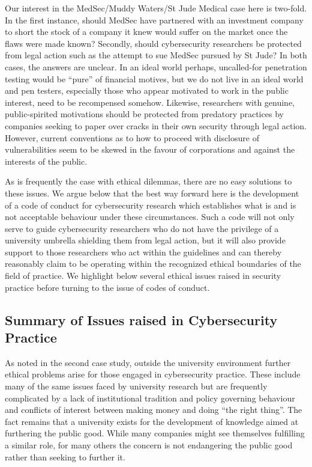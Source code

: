 \documentclass{svjour3}                     %
\begin{document}
Our interest in the MedSec/Muddy Waters/St Jude Medical case here is two-fold. In the first instance, should MedSec have partnered with an investment company to short the stock of a company it knew would suffer on the market once the flaws were made known? Secondly, should cybersecurity researchers be protected from legal action such as the attempt to sue MedSec pursued by St Jude? In both cases, the answers are unclear. In an ideal world perhaps, uncalled-for penetration testing would be ``pure'' of financial motives, but we do not live in an ideal world and pen testers, especially those who appear motivated to work in the public interest, need to be recompensed somehow. Likewise, researchers with genuine, public-spirited motivations should be protected from predatory practices by companies seeking to paper over cracks in their own security through legal action. However, current conventions as to how to proceed with disclosure of vulnerabilities seem to be skewed in the favour of corporations and against the interests of the public. 

As is frequently the case with ethical dilemmas, there are no easy solutions to these issues. We argue below that the best way forward here is the development of a code of conduct for cybersecurity research which establishes what is and is not acceptable behaviour under these circumstances. Such a code will not only serve to guide cybersecurity researchers who do not have the privilege of a university umbrella shielding them from legal action, but it will also provide support to those researchers who act within the guidelines and can thereby reasonably claim to be operating within the recognized ethical boundaries of the field of practice. We highlight below several ethical issues raised in security practice before turning to the issue of codes of conduct.


\subsection{Summary of Issues raised in Cybersecurity Practice}
\label{sec:industryissues}
As noted in the second case study, outside the university environment further ethical problems arise for those engaged in cybersecurity practice.  These include many of the same issues faced by university research but are frequently complicated by a lack of institutional tradition and policy governing behaviour and conflicts of interest between making money and doing ``the right thing''. The fact remains that a university exists for the development of knowledge aimed at furthering the public good.  While many companies might see themselves fulfilling a similar role, for many others the concern is not endangering the public good rather than seeking to further it.
\end{document}
